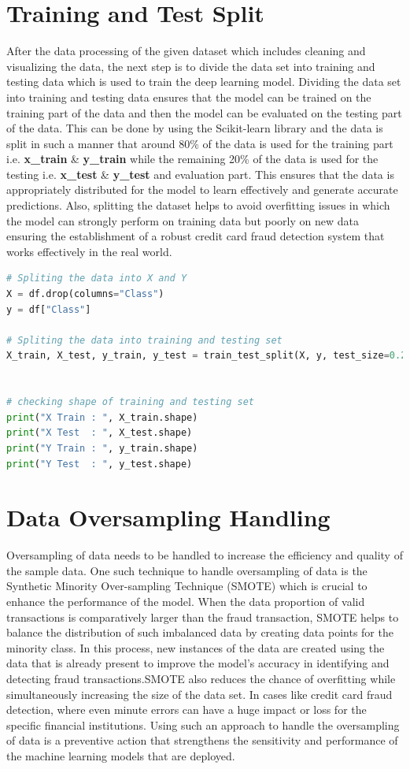  \section{Training and Test Split}
 After the data processing of the given dataset which includes cleaning and visualizing the data, the next step is to divide the data set into training and testing data which is used to train the deep learning model. Dividing the data set into training and testing data ensures that the model can be trained on the training part of the data and then the model can be evaluated on the testing part of the data. This can be done by using the Scikit-learn library and the data is split in such a manner that around 80\% of the data is used for the training part i.e.\textbf{ x\_train }\& \textbf{y\_train }while the remaining 20\% of the data is used for the testing i.e. \textbf{x\_test }\&\textbf{ y\_test} and evaluation part. This ensures that the data is appropriately distributed for the model to learn effectively and generate accurate predictions. Also, splitting the dataset helps to avoid overfitting issues in which the model can strongly perform on training data but poorly on new data ensuring the establishment of a robust credit card fraud detection system that works effectively in the real world.

\begin{lstlisting}[language=Python, caption={Creating and training Catboost model}, label=list:python_code_ex]
# Spliting the data into X and Y
X = df.drop(columns="Class")
y = df["Class"]

# Spliting the data into training and testing set
X_train, X_test, y_train, y_test = train_test_split(X, y, test_size=0.25, random_state=42)


# checking shape of training and testing set
print("X Train : ", X_train.shape)
print("X Test  : ", X_test.shape)
print("Y Train : ", y_train.shape)
print("Y Test  : ", y_test.shape)
\end{lstlisting}

 \section{Data Oversampling Handling}
Oversampling of data needs to be handled to increase the efficiency and quality of the sample data. One such technique to handle oversampling of data is the Synthetic Minority Over-sampling Technique (SMOTE) which is crucial to enhance the performance of the model. When the data proportion of valid transactions is comparatively larger than the fraud transaction, SMOTE helps to balance the distribution of such imbalanced data by creating data points for the minority class. In this process, new instances of the data are created using the data that is already present to improve the model’s accuracy in identifying and detecting fraud transactions.SMOTE also reduces the chance of overfitting while simultaneously increasing the size of the data set. In cases like credit card fraud detection, where even minute errors can have a huge impact or loss for the specific financial institutions. Using such an approach to handle the oversampling of data is a preventive action that strengthens the sensitivity and performance of the machine learning models that are deployed.

